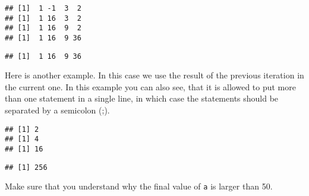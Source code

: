 \documentclass[paper=a4,10pt,div=17,headsepline,BCOR=12mm,twoside,open=right]{scrbook}\usepackage{knitr}
\begin{document}
\begin{knitrout}\footnotesize
{}\color{fgcolor}\begin{kframe}
\begin{alltt}
 \hlkwb{<-} \hlstd{(}\hlstd{,} \hlstd{,} \hlstd{,} \hlstd{,} \hlstd{)}
 \hlkwb{<-} 
  \hlopt{<} 
   \hlkwb{<-} \hlopt{^}
   \hlkwb{<-}  \hlopt{+} 
\hlstd{\}}
\end{alltt}
\begin{verbatim}
## [1]  1 -1  3  2
## [1]  1 16  3  2
## [1]  1 16  9  2
## [1]  1 16  9 36
\end{verbatim}
\begin{alltt}
\end{alltt}
\begin{verbatim}
## [1]  1 16  9 36
\end{verbatim}
\end{kframe}
\end{knitrout}

Here is another example. In this case we use the result of the previous iteration in the current one. In this example you can also see, that it is allowed to put more than one statement in a single line, in which case the statements should be separated by a semicolon (;).

\begin{knitrout}\footnotesize
{}\color{fgcolor}\begin{kframe}
\begin{alltt}
 \hlkwb{<-} 
  \hlopt{<} \hlstd{) \{} \hlkwb{<-} \hlopt{^}\hlstd{\}}
\end{alltt}
\begin{verbatim}
## [1] 2
## [1] 4
## [1] 16
\end{verbatim}
\begin{alltt}
\end{alltt}
\begin{verbatim}
## [1] 256
\end{verbatim}
\end{kframe}
\end{knitrout}

Make sure that you understand why the final value of \texttt{a} is larger than 50.
\end{document}
